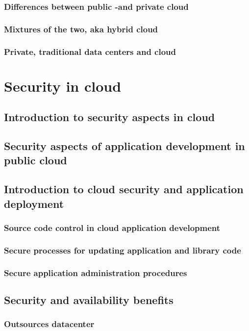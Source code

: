 \documentclass{article}
\begin{document}
\subsubsection{Differences between public -and private cloud}
\blindtext[2]
\subsubsection{Mixtures of the two, aka hybrid cloud}
\blindtext[2]
\subsubsection{Private, traditional data centers and cloud}
\blindtext[2]
\section{Security in cloud}
\blindtext[2]
\subsection{Introduction to security aspects in cloud}
\blindtext[2]
\subsection{Security aspects of application development in public cloud}
\blindtext[2]
\subsection{Introduction to cloud security and application deployment}
\blindtext[2]
\subsubsection{Source code control in cloud application development}
\blindtext[2]
\subsubsection{Secure processes for updating application and library code}
\blindtext[2]
\subsubsection{Secure application administration procedures}
\blindtext[2]
\subsection{Security and availability benefits}
\blindtext[2]
\subsubsection{Outsources datacenter}
\blindtext[2]
\end{document}
